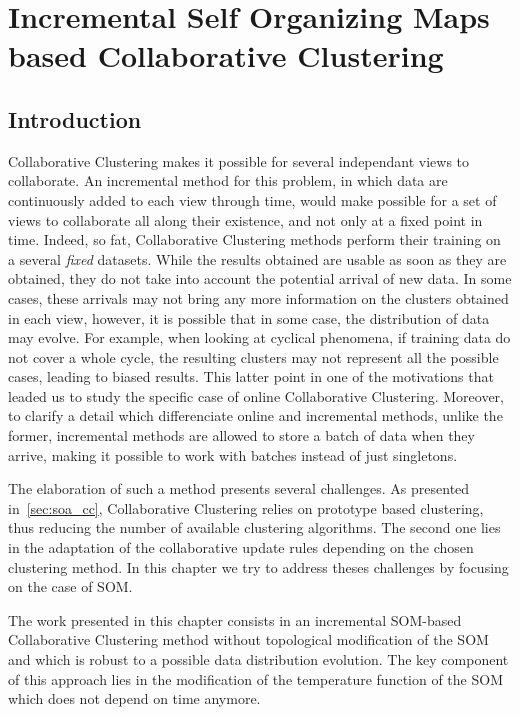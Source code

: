 	\chapter{Incremental Self Organizing Maps based Collaborative Clustering}
\label{ccisom}

\minitoc{}
\newpage

    \section{Introduction}

    Collaborative Clustering makes it possible for several independant views to collaborate. An incremental method for this problem, in which data are continuously added to each view through time, would make possible for a set of views to collaborate all along their existence, and not only at a fixed point in time. Indeed, so fat, Collaborative Clustering methods perform their training on a several \textit{fixed} datasets. While the results obtained are usable as soon as they are obtained, they do not take into account the potential arrival of new data. In some cases, these arrivals may not bring any more information on the clusters obtained in each view, however, it is possible that in some case, the distribution of data may evolve. For example, when looking at cyclical phenomena, if training data do not cover a whole cycle, the resulting clusters may not represent all the possible cases, leading to biased results. This latter point in one of the motivations that leaded us to study the specific case of online Collaborative Clustering. Moreover, to clarify a detail which differenciate online and incremental methods, unlike the former, incremental methods are allowed to store a batch of data when they arrive, making it possible to work with batches instead of just singletons.
	
    The elaboration of such a method presents several challenges. As presented in~\ref{sec:soa_cc}, Collaborative Clustering relies on prototype based clustering, thus reducing the number of available clustering algorithms. The second one lies in the adaptation of the collaborative update rules depending on the chosen clustering method. In this chapter we try to address theses challenges by focusing on the case of SOM.\@
	
    The work presented in this chapter consists in an incremental SOM-based Collaborative Clustering method without topological modification of the SOM and which is robust to a possible data distribution evolution. The key component of this approach lies in the modification of the temperature function of the SOM which does not depend on time anymore.
	
